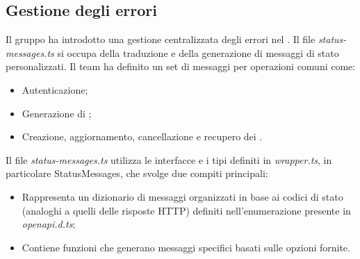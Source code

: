\subsection{Gestione degli errori} \label{GestioneErrori}

\par Il gruppo ha introdotto una gestione centralizzata degli errori nel . Il file \textit{status-messages.ts} si occupa della traduzione e della generazione di messaggi di stato personalizzati. Il team ha definito un set di messaggi per operazioni comuni come:
\begin{itemize}
  \item Autenticazione;
  \item Generazione di ;
  \item Creazione, aggiornamento, cancellazione e recupero dei .
\end{itemize}

\vspace{0.5\baselineskip}
\par Il file \textit{status-messages.ts} utilizza le interfacce e i tipi definiti in \textit{wrapper.ts}, in particolare StatusMessages, che svolge due compiti principali:
\begin{itemize}
  \item Rappresenta un dizionario di messaggi organizzati in base ai codici di stato (analoghi a quelli delle risposte HTTP) definiti nell'enumerazione presente in \textit{openapi.d.ts};
  \item Contiene funzioni che generano messaggi specifici basati sulle opzioni fornite.
\end{itemize}